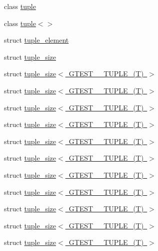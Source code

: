 \begin{DoxyCompactItemize}
\item 
class \mbox{\hyperlink{classstd_1_1tr1_1_1tuple}{tuple}}
\item 
class \mbox{\hyperlink{classstd_1_1tr1_1_1tuple_3_4}{tuple$<$$>$}}
\item 
struct \mbox{\hyperlink{structstd_1_1tr1_1_1tuple__element}{tuple\+\_\+element}}
\item 
struct \mbox{\hyperlink{structstd_1_1tr1_1_1tuple__size}{tuple\+\_\+size}}
\item 
struct \mbox{\hyperlink{structstd_1_1tr1_1_1tuple__size_3_01_g_t_e_s_t__0___t_u_p_l_e___07_t_08_01_4}{tuple\+\_\+size$<$ G\+T\+E\+S\+T\+\_\+\_\+\+T\+U\+P\+L\+E\+\_\+(\+T) $>$}}
\item 
struct \mbox{\hyperlink{structstd_1_1tr1_1_1tuple__size_3_01_g_t_e_s_t__10___t_u_p_l_e___07_t_08_01_4}{tuple\+\_\+size$<$ G\+T\+E\+S\+T\+\_\+\_\+\+T\+U\+P\+L\+E\+\_\+(\+T) $>$}}
\item 
struct \mbox{\hyperlink{structstd_1_1tr1_1_1tuple__size_3_01_g_t_e_s_t__1___t_u_p_l_e___07_t_08_01_4}{tuple\+\_\+size$<$ G\+T\+E\+S\+T\+\_\+\_\+\+T\+U\+P\+L\+E\+\_\+(\+T) $>$}}
\item 
struct \mbox{\hyperlink{structstd_1_1tr1_1_1tuple__size_3_01_g_t_e_s_t__2___t_u_p_l_e___07_t_08_01_4}{tuple\+\_\+size$<$ G\+T\+E\+S\+T\+\_\+\_\+\+T\+U\+P\+L\+E\+\_\+(\+T) $>$}}
\item 
struct \mbox{\hyperlink{structstd_1_1tr1_1_1tuple__size_3_01_g_t_e_s_t__3___t_u_p_l_e___07_t_08_01_4}{tuple\+\_\+size$<$ G\+T\+E\+S\+T\+\_\+\_\+\+T\+U\+P\+L\+E\+\_\+(\+T) $>$}}
\item 
struct \mbox{\hyperlink{structstd_1_1tr1_1_1tuple__size_3_01_g_t_e_s_t__4___t_u_p_l_e___07_t_08_01_4}{tuple\+\_\+size$<$ G\+T\+E\+S\+T\+\_\+\_\+\+T\+U\+P\+L\+E\+\_\+(\+T) $>$}}
\item 
struct \mbox{\hyperlink{structstd_1_1tr1_1_1tuple__size_3_01_g_t_e_s_t__5___t_u_p_l_e___07_t_08_01_4}{tuple\+\_\+size$<$ G\+T\+E\+S\+T\+\_\+\_\+\+T\+U\+P\+L\+E\+\_\+(\+T) $>$}}
\item 
struct \mbox{\hyperlink{structstd_1_1tr1_1_1tuple__size_3_01_g_t_e_s_t__6___t_u_p_l_e___07_t_08_01_4}{tuple\+\_\+size$<$ G\+T\+E\+S\+T\+\_\+\_\+\+T\+U\+P\+L\+E\+\_\+(\+T) $>$}}
\item 
struct \mbox{\hyperlink{structstd_1_1tr1_1_1tuple__size_3_01_g_t_e_s_t__7___t_u_p_l_e___07_t_08_01_4}{tuple\+\_\+size$<$ G\+T\+E\+S\+T\+\_\+\_\+\+T\+U\+P\+L\+E\+\_\+(\+T) $>$}}
\item 
struct \mbox{\hyperlink{structstd_1_1tr1_1_1tuple__size_3_01_g_t_e_s_t__8___t_u_p_l_e___07_t_08_01_4}{tuple\+\_\+size$<$ G\+T\+E\+S\+T\+\_\+\_\+\+T\+U\+P\+L\+E\+\_\+(\+T) $>$}}
\item 
struct \mbox{\hyperlink{structstd_1_1tr1_1_1tuple__size_3_01_g_t_e_s_t__9___t_u_p_l_e___07_t_08_01_4}{tuple\+\_\+size$<$ G\+T\+E\+S\+T\+\_\+\_\+\+T\+U\+P\+L\+E\+\_\+(\+T) $>$}}
\end{DoxyCompactItemize}
